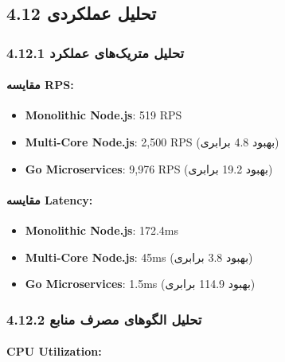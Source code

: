 \documentclass[
]{article}
\providecommand{\tightlist}{%
  \setlength{\itemsep}{0pt}\setlength{\parskip}{0pt}}
\begin{document}
\subsection{4.12 تحلیل
عملکردی}\label{ux62aux62dux644ux6ccux644-ux639ux645ux644ux6a9ux631ux62fux6cc}

\subsubsection{4.12.1 تحلیل متریک‌های
عملکرد}\label{ux62aux62dux644ux6ccux644-ux645ux62aux631ux6ccux6a9ux647ux627ux6cc-ux639ux645ux644ux6a9ux631ux62f}

\paragraph{مقایسه RPS:}\label{ux645ux642ux627ux6ccux633ux647-rps}

\begin{itemize}
\tightlist
\item
  \textbf{Monolithic Node.js}: 519 RPS
\item
  \textbf{Multi-Core Node.js}: 2,500 RPS (بهبود 4.8 برابری)
\item
  \textbf{Go Microservices}: 9,976 RPS (بهبود 19.2 برابری)
\end{itemize}

\paragraph{مقایسه
Latency:}\label{ux645ux642ux627ux6ccux633ux647-latency}

\begin{itemize}
\tightlist
\item
  \textbf{Monolithic Node.js}: 172.4ms
\item
  \textbf{Multi-Core Node.js}: 45ms (بهبود 3.8 برابری)
\item
  \textbf{Go Microservices}: 1.5ms (بهبود 114.9 برابری)
\end{itemize}

\subsubsection{4.12.2 تحلیل الگوهای مصرف
منابع}\label{ux62aux62dux644ux6ccux644-ux627ux644ux6afux648ux647ux627ux6cc-ux645ux635ux631ux641-ux645ux646ux627ux628ux639}

\paragraph{CPU Utilization:}\label{cpu-utilization}
\end{document}
